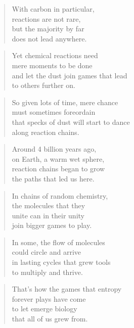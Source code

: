 \documentclass[10pt,a4paper]{article}
\begin{document}
\begin{multicols}{2}
\begin{verse}
With carbon in particular,\\
reactions are not rare,\\
but the majority by far\\
does not lead anywhere.
\end{verse}

\begin{verse}
Yet chemical reactions need\\
mere moments to be done\\
and let the dust join games that lead\\
to others further on.
\end{verse}

\begin{verse}
So given lots of time, mere chance\\
must sometimes foreordain\\
that specks of dust will start to dance\\
along reaction chains.
\end{verse}

\begin{verse}
Around 4 billion years ago,\\
on Earth, a warm wet sphere,\\
reaction chains began to grow\\
the paths that led us here.
\end{verse}

\begin{verse}
In chains of random chemistry,\\
the molecules that they\\
unite can in their unity\\
join bigger games to play.
\end{verse}

\begin{verse}
In some, the flow of molecules\\
could circle and arrive\\
in lasting cycles that grew tools\\
to multiply and thrive.
\end{verse}

\begin{verse}
That’s how the games that entropy\\
forever plays have come\\
to let emerge biology\\
that all of us grew from.
\end{verse}


\end{multicols}
\end{document}
